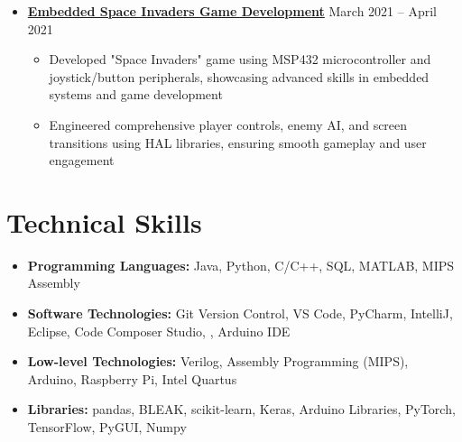 \documentclass[letterpaper,11pt]{article}
\begin{document}
\begin{itemize}[leftmargin=0mm, label={}, itemsep=0pt]
  \item \href{https://github.com/rm1738/Space-Invaders-/blob/main/proj2_main.c}{\textbf{Embedded Space Invaders Game Development}} \hfill {March 2021 -- April 2021} \\
  \vspace{0\topsep} %
  \vspace{-\partopsep} %
  \vspace{-\baselineskip} %
  \begin{itemize}[leftmargin=5mm, itemsep=0pt, topsep=0pt, parsep=0pt, label={\textbullet}]
    \item Developed "Space Invaders" game using MSP432 microcontroller and joystick/button peripherals, showcasing advanced skills in embedded systems and game development
    \item Engineered comprehensive player controls, enemy AI, and screen transitions using HAL libraries, ensuring smooth gameplay and user engagement
  \end{itemize}
  \vspace{-\parsep} %
\end{itemize}


\section{Technical Skills}
\begin{itemize}[leftmargin=0mm, label={}, itemsep=-3pt] %
  \small
    \item \textbf{Programming Languages:} Java, Python, C/C++, SQL, MATLAB, MIPS Assembly
    \item \textbf{Software Technologies:} Git Version Control, VS Code, PyCharm, IntelliJ, Eclipse, Code Composer Studio, , Arduino IDE
    \item \textbf{Low-level Technologies:} Verilog, Assembly Programming (MIPS), Arduino, Raspberry Pi, Intel Quartus
    \item \textbf{Libraries:} pandas, BLEAK, scikit-learn, Keras, Arduino Libraries, PyTorch, TensorFlow, PyGUI, Numpy
\end{itemize}
\end{document}
